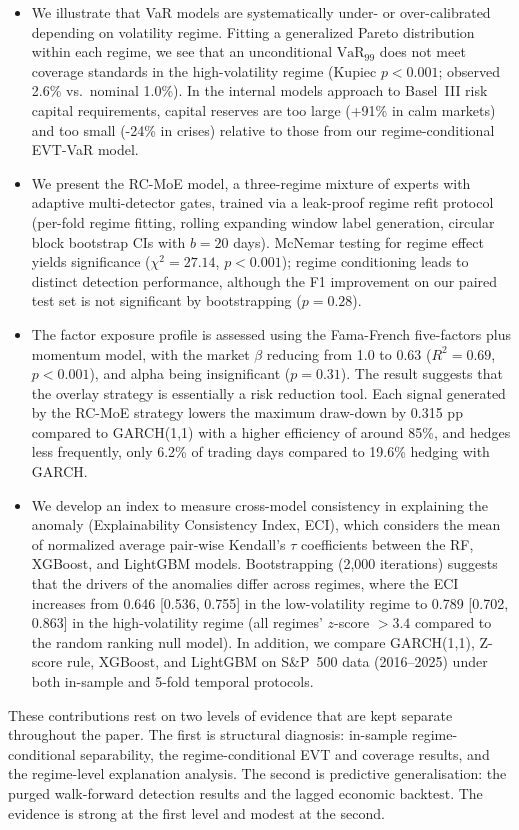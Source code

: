 \documentclass[]{interact}
\begin{document}
\begin{itemize}
\item We illustrate that VaR models are systematically
under- or over-calibrated depending on volatility regime.
Fitting a generalized Pareto distribution within each
regime, we see that an unconditional $\text{VaR}_{99}$ does not
meet coverage standards in the high-volatility regime
(Kupiec $p < 0.001$; observed 2.6\% vs.\ nominal 1.0\%).
In the internal models approach to Basel~III risk
capital requirements, capital reserves are too large (+91\%
in calm markets) and too small (-24\% in crises) relative
to those from our regime-conditional EVT-VaR model.

\item We present the RC-MoE model, a three-regime
mixture of experts with adaptive multi-detector gates,
trained via a leak-proof regime refit protocol (per-fold regime fitting, rolling expanding window label
generation, circular block bootstrap CIs with $b = 20$
days). McNemar testing for regime effect yields
significance ($\chi^2 = 27.14$, $p < 0.001$); regime conditioning leads to distinct detection performance, although the F1 improvement on our paired test set is
not significant by bootstrapping ($p = 0.28$).

\item The factor exposure profile is assessed using the Fama-French five-factors plus momentum model, with
the market $\beta$ reducing from 1.0 to 0.63 ($R^2 = 0.69$, $p < 0.001$), and alpha being insignificant ($p =
0.31$). The result suggests that the overlay strategy is essentially a risk reduction tool. Each signal generated by the RC-MoE strategy lowers the maximum draw-down by 0.315 pp compared to GARCH(1,1)
with a higher efficiency of around 85\%, and hedges less frequently, only 6.2\% of trading days compared to 19.6\% hedging with GARCH.

\item We develop an index to measure cross-model consistency in explaining the anomaly (Explainability
Consistency Index, ECI), which considers the mean of normalized average pair-wise Kendall's $\tau$ coefficients between the RF, XGBoost, and LightGBM models. Bootstrapping (2{,}000 iterations) suggests
that the drivers of the anomalies differ across regimes, where the ECI increases from
0.646 [0.536, 0.755] in the low-volatility regime to 0.789 [0.702, 0.863] in the high-volatility regime (all regimes' $z$-score $> 3.4$ compared to the random ranking null model). In addition, we compare GARCH(1,1), Z-score rule, XGBoost, and
LightGBM on S\&P~500 data (2016--2025) under both in-sample and 5-fold temporal protocols.

\end{itemize}
These contributions rest on two levels of evidence that are kept separate throughout the paper. The first is structural diagnosis: in-sample regime-conditional separability, the regime-conditional EVT and coverage results, and the regime-level explanation analysis. The second is predictive generalisation: the purged walk-forward detection results and the lagged economic backtest. The evidence is strong at the first level and modest at the second.
\end{document}
